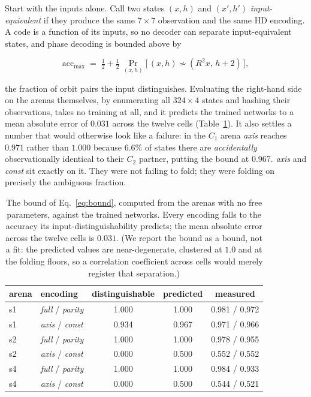 \documentclass[9pt,lineno]{elife}
\begin{document}
Start with the inputs alone. Call two states $(x,h)$ and $(x',h')$ \emph{input-equivalent} if they
produce the same $7\times7$ observation and the same HD encoding. A code is a function of its inputs, so
no decoder can separate input-equivalent states, and phase decoding is bounded above by

\begin{equation}
\mathrm{acc}_{\max} \;=\; \tfrac12 + \tfrac12 \, \Pr_{(x,h)}\!\big[\,(x,h) \not\sim (R^2x,\, h+2)\,\big],
\label{eq:bound}
\end{equation}

the fraction of orbit pairs the input distinguishes. Evaluating the right-hand side on the arenas
themselves, by enumerating all $324\times4$ states and hashing their observations, takes no training
at all, and it predicts the trained networks to a mean absolute error of $0.031$ across the twelve cells
(Table~\ref{tab:bound}). It also settles a number that would otherwise look like a failure: in the $C_1$
arena \textit{axis} reaches $0.971$ rather than $1.000$ because $6.6\%$ of states there are
\emph{accidentally} observationally identical to their $C_2$ partner, putting the bound at $0.967$.
\textit{axis} and \textit{const} sit exactly on it. They were not failing to fold; they were folding on
precisely the ambiguous fraction.

\begin{table}[t]
\centering
\caption{The bound of Eq.~\ref{eq:bound}, computed from the arenas with no free parameters,
against the trained networks. Every encoding falls to the accuracy its input-distinguishability
predicts; the mean absolute error across the twelve cells is $0.031$. (We report the bound as a
bound, not a fit: the predicted values are near-degenerate, clustered at $1.0$ and at the
folding floors, so a correlation coefficient across cells would merely register that
separation.)}
\label{tab:bound}
\begin{tabular}{llccc}
\toprule
arena & encoding & distinguishable & predicted & measured \\
\midrule
s1 & \textit{full} / \textit{parity} & 1.000 & 1.000 & 0.981 / 0.972 \\
s1 & \textit{axis} / \textit{const}  & 0.934 & 0.967 & 0.971 / 0.966 \\
s2 & \textit{full} / \textit{parity} & 1.000 & 1.000 & 0.978 / 0.955 \\
s2 & \textit{axis} / \textit{const}  & 0.000 & 0.500 & 0.552 / 0.552 \\
s4 & \textit{full} / \textit{parity} & 1.000 & 1.000 & 0.984 / 0.933 \\
s4 & \textit{axis} / \textit{const}  & 0.000 & 0.500 & 0.544 / 0.521 \\
\bottomrule
\end{tabular}
\end{table}
\end{document}
